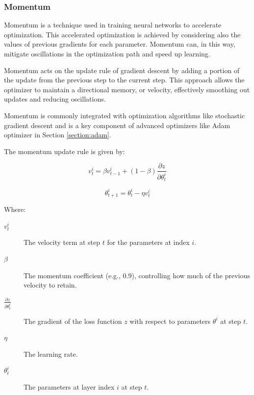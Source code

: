 		\bigskip
		\subsubsection{Momentum}
		\label{section:momentum}
		
		Momentum is a technique used in training neural networks to accelerate optimization. This accelerated optimization is achieved by considering also the values of previous gradients for each parameter. Momentum can, in this way, mitigate oscillations in the optimization path and speed up learning\cite{zhang2011momentum}.
		
		Momentum acts on the update rule of gradient descent by adding a portion of the update from the previous step to the current step. This approach allows the optimizer to maintain a directional memory, or velocity, effectively smoothing out updates and reducing oscillations.
		
		Momentum is commonly integrated with optimization algorithms like stochastic gradient descent and is a key component of advanced optimizers like Adam optimizer in Section \ref{section:adam}.
		
		The momentum update rule is given by\cite{joshi2019performance}:
		
		\begin{equation}
			v^i_t = \beta v^i_{t-1} + (1 - \beta)\frac{\partial z}{\partial \theta^i_{t}}	
		\end{equation}
		
		\begin{equation}
			\theta^i_{t+1} = \theta^i_t - \eta v^i_t
		\end{equation}
		
		Where:
		\begin{description}
			\item[$v^i_t$] The velocity term at step $t$ for the parameters at index $i$.
			\item[$\beta$] The momentum coefficient (e.g., $0.9$), controlling how much of the previous velocity to retain.
			\item[$\frac{\partial z}{\partial \theta^i_{t}}$] The gradient of the loss function $z$ with respect to parameters $\theta^i$ at step $t$.
			\item[$\eta$] The learning rate.
			\item[$\theta^i_t$] The parameters at layer index $i$ at step $t$.
		\end{description}
		\bigskip

		
		
